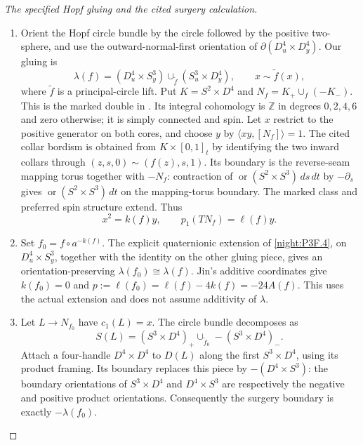 \begin{proof}[The specified Hopf gluing and the cited surgery calculation]
\begin{enumerate}[label=\arabic*.]
\item Orient the Hopf circle bundle by the circle followed by the positive
two-sphere, and use the outward-normal-first orientation of
$\partial(D^4_u\times D^4_y)$. Our gluing is
\[
 \lambda(f)=(D^4_u\times S^3_y)\cup_{\widetilde f}(S^3_u\times D^4_y),
 \qquad x\sim\widetilde f(x),
\]
where $\widetilde f$ is a principal-circle lift. Put
$K=S^2\times D^4$ and $N_f=K_+\cup_f(-K_-)$. This is the marked double
in \cite[Lemma~6.2, pp.~34--35]{Jin2026}. Its integral cohomology is
$\mathbb Z$ in degrees $0,2,4,6$ and zero otherwise; it is simply
connected and spin. Let $x$ restrict to the positive generator on both
cores, and choose $y$ by $\langle xy,[N_f]\rangle=1$. The cited collar
bordism is obtained from $K\times[0,1]_t$ by identifying the two inward
collars through $(z,s,0)\sim(f(z),s,1)$. Its boundary is the reverse-seam
mapping torus together with $-N_f$: contraction of
$\operatorname{or}(S^2\times S^3)\,ds\,dt$ by $-\partial_s$ gives
$\operatorname{or}(S^2\times S^3)\,dt$ on the mapping-torus boundary.
The marked class and preferred spin structure extend. Thus
\[
 x^2=k(f)y,\qquad p_1(TN_f)=\ell(f)y. \tag{P3F.22.2}
\]

\item Set $f_0=f\circ a^{-k(f)}$. The explicit quaternionic extension
of \cref{night:P3F.4}, on $D^4_u\times S^3_y$, together with the identity
on the other gluing piece, gives an orientation-preserving
$\lambda(f_0)\cong\lambda(f)$. Jin's additive coordinates give
$k(f_0)=0$ and $p:=\ell(f_0)=\ell(f)-4k(f)=-24A(f)$.
This uses the actual extension and does not assume additivity of
$\lambda$.

\item Let $L\to N_{f_0}$ have $c_1(L)=x$. The circle bundle decomposes as
\[
 S(L)=(S^3\times D^4)_+\cup_{\widetilde f_0}-(S^3\times D^4)_-.
\]
Attach a four-handle $D^4\times D^4$ to $D(L)$ along the first
$S^3\times D^4$, using its product framing. Its boundary replaces this
piece by $-(D^4\times S^3)$: the boundary orientations of
$S^3\times D^4$ and $D^4\times S^3$ are respectively the negative and
positive product orientations. Consequently the surgery boundary is
exactly $-\lambda(f_0)$.


\end{enumerate}
\end{proof}
